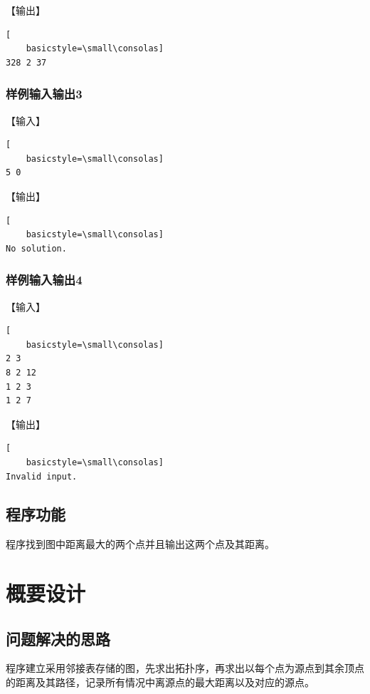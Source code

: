 \documentclass{article}
\begin{document}
【输出】

\begin{lstlisting}[
    basicstyle=\small\consolas]
328 2 37
\end{lstlisting}

\subsubsection{样例输入输出3}

【输入】

\begin{lstlisting}[
    basicstyle=\small\consolas]
5 0
\end{lstlisting}

【输出】

\begin{lstlisting}[
    basicstyle=\small\consolas]
No solution.
\end{lstlisting}

\subsubsection{样例输入输出4}

【输入】

\begin{lstlisting}[
    basicstyle=\small\consolas]
2 3
8 2 12 
1 2 3
1 2 7
\end{lstlisting}

【输出】

\begin{lstlisting}[
    basicstyle=\small\consolas]
Invalid input.
\end{lstlisting}

\subsection{程序功能}

程序找到图中距离最大的两个点并且输出这两个点及其距离。

\section{概要设计}

\subsection{问题解决的思路}

程序建立采用邻接表存储的图，先求出拓扑序，再求出以每个点为源点到其余顶点的距离及其路径，记录所有情况中离源点的最大距离以及对应的源点。
\end{document}
